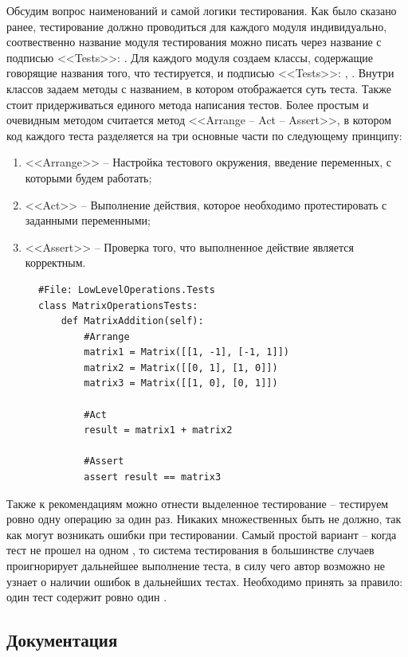 	Обсудим вопрос наименований и самой логики тестирования. Как было сказано ранее, тестирование должно проводиться для каждого модуля индивидуально, соотвественно название модуля тестирования можно писать через название с подписью <<Tests>>: . Для каждого модуля создаем классы, содержащие говорящие названия того, что тестируется, и подписью <<Tests>>: , . Внутри классов задаем методы с названием, в котором отображается суть теста. Также стоит придерживаться единого метода написания тестов. Более простым и очевидным методом считается метод <<Arrange -- Act -- Assert>>, в котором код каждого теста разделяется на три основные части по следующему принципу:
	\begin{enumerate}
		\item <<Arrange>> -- Настройка тестового окружения, введение переменных, с которыми будем работать;
		\item <<Act>> -- Выполнение действия, которое необходимо протестировать с заданными переменными;
		\item <<Assert>> -- Проверка того, что выполненное действие является корректным.
	\end{enumerate} 

	\begin{figure}[H]
\begin{lstlisting}[caption=<<Пример (Python)>>]
#File: LowLevelOperations.Tests
class MatrixOperationsTests:
	def MatrixAddition(self):
		#Arrange
		matrix1 = Matrix([[1, -1], [-1, 1]])
		matrix2 = Matrix([[0, 1], [1, 0]])
		matrix3 = Matrix([[1, 0], [0, 1]])

		#Act
		result = matrix1 + matrix2

		#Assert
		assert result == matrix3
\end{lstlisting}
	\end{figure}

	Также к рекомендациям можно отнести выделенное тестирование -- тестируем ровно одну операцию за один раз. Никаких множественных  быть не должно, так как могут возникать ошибки при тестировании. Самый простой вариант -- когда тест не прошел на одном , то система тестирования в большинстве случаев проигнорирует дальнейшее выполнение теста, в силу чего автор возможно не узнает о наличии ошибок в дальнейших тестах. Необходимо принять за правило: один тест содержит ровно один .


\subsection{Документация}

